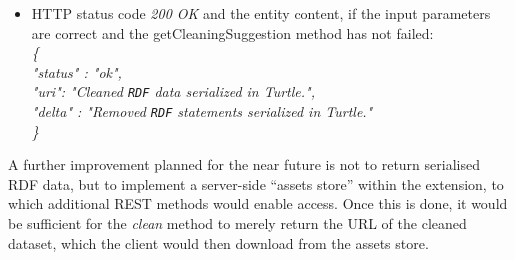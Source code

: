 \begin{description}
\begin{itemize}
\item  HTTP status code \textit{200 OK} and the entity content, if the input parameters are correct and the getCleaningSuggestion method has not failed: \\ \hspace*{0.2 cm} \textit{\{}\\ \hspace*{0.5 cm} \textit{"status" : "ok",}\\ \hspace*{0.5 cm} \textit{"uri":  "Cleaned \texttt{RDF} data serialized in Turtle.",} \\ \hspace*{0.5 cm}\textit{"delta" : "Removed \texttt{RDF} statements serialized in Turtle."} \\ \hspace*{0.2 cm}\textit{\}} 
\end{itemize}

A further improvement planned for the near future is not to return serialised RDF data, but to implement a server-side ``assets store'' within the extension, to which additional REST methods would enable access.
Once this is done, it would be sufficient for the \textit{clean} method to merely return the URL of the cleaned dataset, which the client would then download from the assets store.
\end{description}

